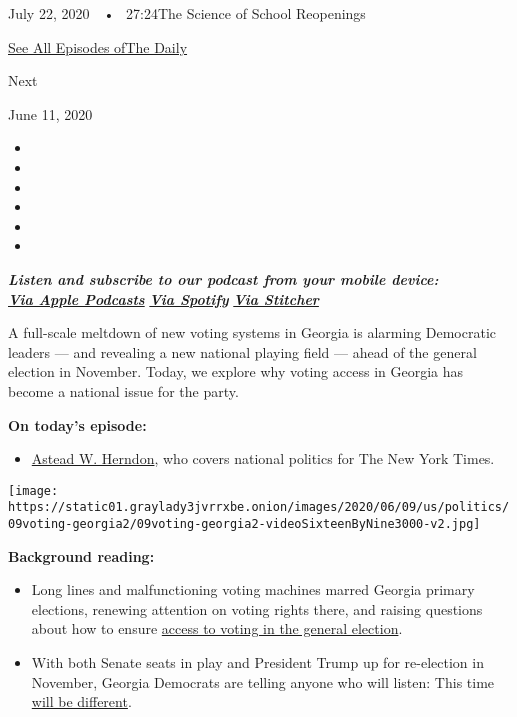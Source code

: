 July 22, 2020~~•~ 27:24The Science of School Reopenings

\href{https://www.nytimes3xbfgragh.onion/column/the-daily}{See All
Episodes ofThe Daily}

Next

June 11, 2020

\begin{itemize}
\item
\item
\item
\item
\item
\item
\end{itemize}

\emph{\textbf{Listen and subscribe to our podcast from your mobile
device:}}\\
\textbf{\href{https://itunes.apple.com/us/podcast/the-daily/id1200361736?mt=2}{\emph{Via
Apple Podcasts}}} \emph{\textbf{\textbar{}}}
\textbf{\href{https://open.spotify.com/show/3IM0lmZxpFAY7CwMuv9H4g?si=SfuMSC55R1qprFsRZU3_zw}{\emph{Via
Spotify}}} \emph{\textbf{\textbar{}}}
\textbf{\href{http://www.stitcher.com/podcast/the-new-york-times/the-daily-10}{\emph{Via
Stitcher}}}

A full-scale meltdown of new voting systems in Georgia is alarming
Democratic leaders --- and revealing a new national playing field ---
ahead of the general election in November. Today, we explore why voting
access in Georgia has become a national issue for the party.

\textbf{On today's episode:}

\begin{itemize}
\tightlist
\item
  \href{https://www.nytimes3xbfgragh.onion/by/astead-w-herndon}{Astead
  W. Herndon}, who covers national politics for The New York Times.
\end{itemize}

\texttt{[image: https://static01.graylady3jvrrxbe.onion/images/2020/06/09/us/politics/09voting-georgia2/09voting-georgia2-videoSixteenByNine3000-v2.jpg]}

\textbf{Background reading:}

\begin{itemize}
\item
  Long lines and malfunctioning voting machines marred Georgia primary
  elections, renewing attention on voting rights there, and raising
  questions about how to ensure
  \href{https://www.nytimes3xbfgragh.onion/2020/06/09/us/politics/atlanta-voting-georgia-primary.html}{access
  to voting in the general election}.
\item
  With both Senate seats in play and President Trump up for re-election
  in November, Georgia Democrats are telling anyone who will listen:
  This time
  \href{https://www.nytimes3xbfgragh.onion/2020/06/09/us/politics/georgia-primary-election-senate-race-jon-ossoff.html}{will
  be different}.
\end{itemize}

